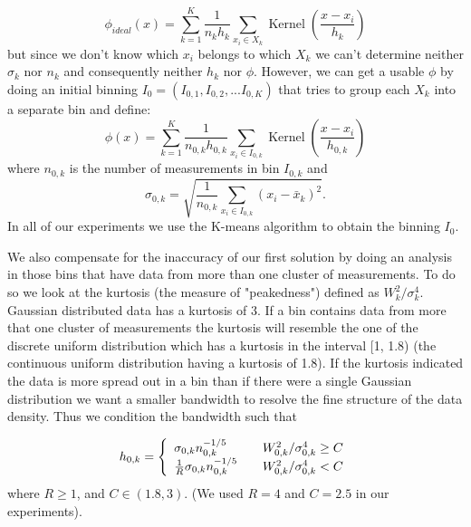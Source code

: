 \[
	\phi_{ideal}(x) = \sum_{k=1}^K \frac{1}{n_k h_k} \sum_{x_i \in X_k} \operatorname{Kernel} \left ( \frac{x - x_i}{h_k} \right )
\]
but since we don't know which $x_i$ belongs to which $X_k$ we can't determine neither $\sigma_k$ nor $n_k$ and consequently neither $h_k$ nor $\phi$. However, we can get a usable $\phi$ by doing an initial binning $I_0 = (I_{0,1}, I_{0,2}, ... I_{0,K})$ that tries to group each $X_k$ into a separate bin and define:
\begin{equation}
	\phi(x) = \sum_{k=1}^K \frac{1}{n_{0,k} h_{0,k}} \sum_{x_i \in I_{0,k}} \operatorname{Kernel} \left ( \frac{x - x_i}{h_{0,k}} \right )
\end{equation}
where $n_{0,k}$ is the number of measurements in bin $I_{0,k}$ and
\begin{equation}
	\sigma_{0,k} = \sqrt{\frac{1}{n_{0,k}} \sum_{x_i \in I_{0,k}}(x_i - \bar{x}_k)^2}. 
\end{equation}
 In all of our experiments we use the K-means algorithm to obtain the binning $I_0$.
\par
We also compensate for the inaccuracy of our first solution by doing an analysis in those bins that have data from more than one cluster of measurements. To do so we look at the kurtosis (the measure of "peakedness") defined as $W_k^2/\sigma_k^4$. Gaussian distributed data has a kurtosis of 3. If a bin contains data from more that one cluster of measurements the kurtosis will resemble the one of the discrete uniform distribution which has a kurtosis in the interval [1, 1.8) (the continuous uniform distribution having a kurtosis of 1.8). If the kurtosis indicated the data is more spread out in a bin than if there were a single Gaussian distribution we want a smaller bandwidth to resolve the fine structure of the data density. Thus we condition the bandwidth such that 

\[
  h_{0,k} = \left\{ 
  \begin{array}{l l}
    \sigma_{0,k} n_{0,k}^{-1/5} & \quad  W_{0,k}^2/\sigma_{0,k}^4 \geq C\\
    \frac{1}{R}\sigma_{0,k} n_{0,k}^{-1/5} & \quad W_{0,k}^2/\sigma_{0,k}^4 < C\\
  \end{array} \right.
\]
where $R \geq 1$, and $C \in (1.8,3)$. (We used $R=4$ and $C=2.5$ in our experiments). 

